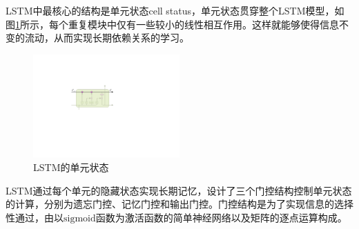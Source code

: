 \documentclass[master]{thesis-uestc}
\begin{document}
LSTM中最核心的结构是单元状态cell status，单元状态贯穿整个LSTM模型，如图\ref{Figure.2.5}所示，每个重复模块中仅有一些较小的线性相互作用。这样就能够使得信息不变的流动，从而实现长期依赖关系的学习。
\begin{figure}[!ht]
\centering 
\includegraphics[width=0.5\textwidth]{./pic/LSTM-cell.pdf}
\caption{LSTM的单元状态}
\label{Figure.2.5}
\end{figure}

LSTM通过每个单元的隐藏状态实现长期记忆，设计了三个门控结构控制单元状态的计算，分别为遗忘门控、记忆门控和输出门控。门控结构是为了实现信息的选择性通过，由以$\mathrm{sigmoid}$函数为激活函数的简单神经网络以及矩阵的逐点运算构成。
\end{document}
